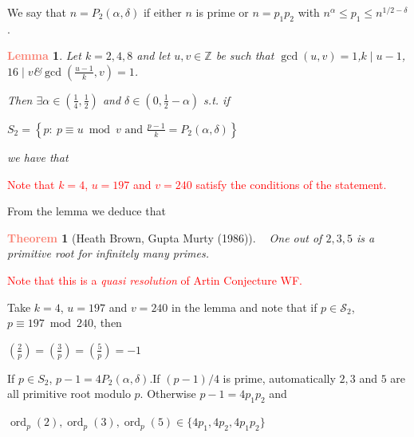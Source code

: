 \documentclass[landscape]{powersem} %
\newtheorem{lem}{\textcolor{Salmon}{Lemma}}
\newtheorem{teo}{\textcolor{Salmon}{Theorem}}
\newcommand{\Z}{{\mathbb Z}}
\newcommand{\ord}{\operatorname{ord}}
\newcommand{\matitablu}{\textcolor{MidnightBlue}{\ding{46}}}
\newcommand{\heading}[1]{%
 \begin{center}
  \large\bf
  \shadowbox{{\textcolor{conceptcolor}{#1}}}%
 \end{center}
 \vspace{1ex minus 1ex}}
\begin{document}
\begin{slide}
\heading{Heath--Brown, Gupta Murty (HGM) }\pause

We say that $n=P_2(\alpha,\delta)$ if either $n$ is prime or $n=p_1p_2$ with
$n^\alpha\leq p_1\leq n^{1/2-\delta}$.\pause

\begin{lem} Let $k=2,4,8$ and let $u,v\in\Z$ be such that\pause
  \matitablu\quad $\gcd(u,v)=1$,\qquad $k\mid u-1$,\qquad $16\mid v$\quad \&\quad  $\gcd(\frac{u-1}k,v)=1$.\pause

Then $\exists \alpha\in\left(\frac14,\frac12\right)$ and $\delta\in (0,\frac12-\alpha)$ s.t. if
\centerline{$\displaystyle{S_2=\left\{p:\ p\equiv u\bmod v\text{ and }\frac{p-1}k=P_2(\alpha,\delta)\right\}}$}\pause
we have that
\centerline{}
\end{lem}\pause

\textcolor{red}{Note that $k=4$, $u=197$ and $v=240$ satisfy the conditions of the statement.}
\end{slide}

\begin{slide}
From the lemma we deduce that\pause

\begin{teo}[Heath Brown, Gupta Murty (1986)]\ \pause
One out of $2,3,5$ is a primitive root for infinitely many primes.
\end{teo}\pause

\textcolor{red}{Note that this is a \emph{quasi resolution} of Artin Conjecture WF.}\pause

 Take $k=4$, $u=197$ and $v=240$ in the lemma and note that if $p\in \mathcal S_2$,
$p\equiv 197\bmod240$, then\pause\medskip
\centerline{$\displaystyle{\left(\frac{2}{p}\right)=\left(\frac{3}{p}\right)=\left(\frac{5}{p}\right)=-1}$}\bigskip\pause
If $p\in S_2$, $p-1=4P_2(\alpha,\delta)$.\pause If $(p-1)/4$ is prime, automatically $2,3$ and $5$ are all primitive root modulo $p$. Otherwise $p-1=4p_1p_2$ and \pause\medskip
\centerline{$\displaystyle{\ord_p(2),\ord_p(3),\ord_p(5)\in\{4p_1,4p_2,4p_1p_2\}}$}
\end{slide}
\end{document}
